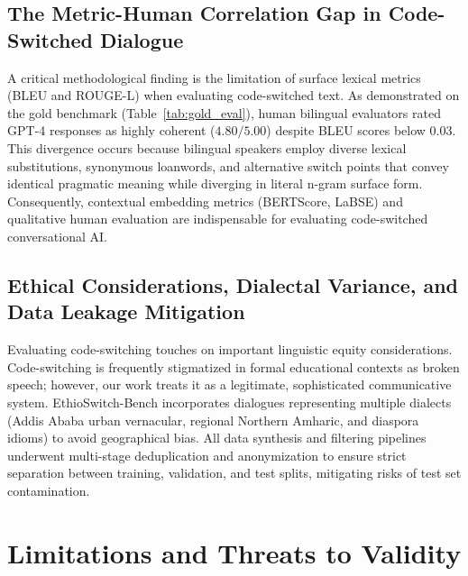 \documentclass[11pt,a4paper]{article}
\begin{document}
\subsection{The Metric-Human Correlation Gap in Code-Switched Dialogue}
A critical methodological finding is the limitation of surface lexical metrics (BLEU and ROUGE-L) when evaluating code-switched text. As demonstrated on the gold benchmark (Table~\ref{tab:gold_eval}), human bilingual evaluators rated GPT-4 responses as highly coherent ($4.80/5.00$) despite BLEU scores below 0.03. This divergence occurs because bilingual speakers employ diverse lexical substitutions, synonymous loanwords, and alternative switch points that convey identical pragmatic meaning while diverging in literal n-gram surface form. Consequently, contextual embedding metrics (BERTScore, LaBSE) and qualitative human evaluation are indispensable for evaluating code-switched conversational AI.

\subsection{Ethical Considerations, Dialectal Variance, and Data Leakage Mitigation}
Evaluating code-switching touches on important linguistic equity considerations. Code-switching is frequently stigmatized in formal educational contexts as broken speech; however, our work treats it as a legitimate, sophisticated communicative system. EthioSwitch-Bench incorporates dialogues representing multiple dialects (Addis Ababa urban vernacular, regional Northern Amharic, and diaspora idioms) to avoid geographical bias. All data synthesis and filtering pipelines underwent multi-stage deduplication and anonymization to ensure strict separation between training, validation, and test splits, mitigating risks of test set contamination.

\section{Limitations and Threats to Validity}
\end{document}
